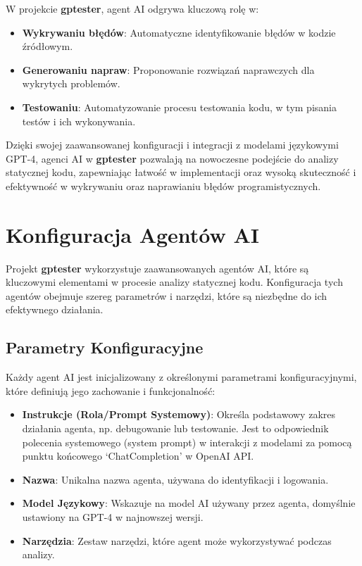 W projekcie \textbf{gptester}, agent AI odgrywa kluczową rolę w:

\begin{itemize}
    \item \textbf{Wykrywaniu błędów}: Automatyczne identyfikowanie błędów w kodzie źródłowym.
    \item \textbf{Generowaniu napraw}: Proponowanie rozwiązań naprawczych dla wykrytych problemów.
    \item \textbf{Testowaniu}: Automatyzowanie procesu testowania kodu, w tym pisania testów i ich wykonywania.
\end{itemize}

Dzięki swojej zaawansowanej konfiguracji i integracji z modelami językowymi GPT-4, agenci AI w \textbf{gptester} pozwalają na nowoczesne podejście do analizy statycznej kodu, zapewniając łatwość w implementacji oraz wysoką skuteczność i efektywność w wykrywaniu oraz naprawianiu błędów programistycznych.

\section{Konfiguracja Agentów AI}
\label{subsec:konfiguracja_agentow}

Projekt \textbf{gptester} wykorzystuje zaawansowanych agentów AI, które są kluczowymi elementami w procesie analizy statycznej kodu. Konfiguracja tych agentów obejmuje szereg parametrów i narzędzi, które są niezbędne do ich efektywnego działania.

\subsection{Parametry Konfiguracyjne}

Każdy agent AI jest inicjalizowany z określonymi parametrami konfiguracyjnymi, które definiują jego zachowanie i funkcjonalność:

\begin{itemize}
    \item \textbf{Instrukcje (Rola/Prompt Systemowy)}: Określa podstawowy zakres działania agenta, np. debugowanie lub testowanie. Jest to odpowiednik polecenia systemowego (system prompt) w interakcji z modelami za pomocą punktu końcowego `ChatCompletion' w OpenAI API.
    \item \textbf{Nazwa}: Unikalna nazwa agenta, używana do identyfikacji i logowania.
    \item \textbf{Model Językowy}: Wskazuje na model AI używany przez agenta, domyślnie ustawiony na GPT-4 w najnowszej wersji.
    \item \textbf{Narzędzia}: Zestaw narzędzi, które agent może wykorzystywać podczas analizy.
\end{itemize}

